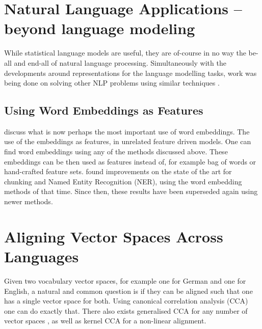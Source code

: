 {\section{Natural Language Applications -- beyond language modeling}
While statistical language models are useful, they are of-course in no way the be-all and end-all of natural language processing.
Simultaneously with the developments around representations for the language modelling tasks, work was being done on solving other NLP problems using similar techniques .


\subsection{Using Word Embeddings as Features}


 discuss what is now perhaps the most important use of word embeddings.
The use of the embeddings as features, in unrelated feature driven models.
One can find word embeddings using any of the methods discussed above.
These embeddings can be then used as features instead of, for example bag of words or hand-crafted feature sets.
\textcite{turian2010word} found improvements on the state of the art for chunking and Named Entity Recognition (NER), using the word embedding methods of that time.
Since then, these results have been superseded again using newer methods.


\section{Aligning Vector Spaces Across Languages}\label{sec:aligning-vector-spaces-across-languages}
Given two vocabulary vector spaces, for example one for German and one for English,
a natural and common question is if they can be aligned such that one has a single vector space for both.
Using canonical correlation analysis (CCA) one can do exactly that.
There also exists generalised CCA for any number of vector spaces ,
as well as kernel CCA for a non-linear alignment.

}
